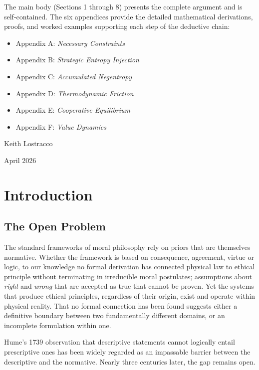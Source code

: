 \documentclass[11pt]{article}
\theoremstyle{plain}
\theoremstyle{definition}
\theoremstyle{remark}
\let\origsection\section
\renewcommand{\section}{\needspace{12\baselineskip}\origsection}
\let\origsubsection\subsection
\renewcommand{\subsection}{\needspace{7\baselineskip}\origsubsection}
\providecommand{\tightlist}{%
  \setlength{\itemsep}{0pt}\setlength{\parskip}{0pt}}
\begin{document}
The main body (Sections 1 through 8) presents the complete argument and
is self-contained. The six appendices provide the detailed mathematical
derivations, proofs, and worked examples supporting each step of the
deductive chain:

\begin{itemize}
\tightlist
\item
  Appendix A: \emph{Necessary Constraints}
\item
  Appendix B: \emph{Strategic Entropy Injection}
\item
  Appendix C: \emph{Accumulated Negentropy}
\item
  Appendix D: \emph{Thermodynamic Friction}
\item
  Appendix E: \emph{Cooperative Equilibrium}
\item
  Appendix F: \emph{Value Dynamics}
\end{itemize}

\vspace{1em}

Keith Lostracco

April 2026

\section{Introduction}\label{introduction}

\subsection{The Open Problem}\label{the-open-problem}

The standard frameworks of moral philosophy rely on priors that are
themselves normative. Whether the framework is based on consequence,
agreement, virtue or logic, to our knowledge no formal derivation has
connected physical law to ethical principle without terminating in
irreducible moral postulates; assumptions about \emph{right} and
\emph{wrong} that are accepted as true that cannot be proven. Yet the
systems that produce ethical principles, regardless of their origin,
exist and operate within physical reality. That no formal connection has
been found suggests either a definitive boundary between two
fundamentally different domains, or an incomplete formulation within
one.

Hume's 1739 observation that descriptive statements cannot logically
entail prescriptive ones \citep[3.1.1]{Hume1739} has been widely
regarded as an impassable barrier between the descriptive and the
normative. Nearly three centuries later, the gap remains open.
\end{document}
